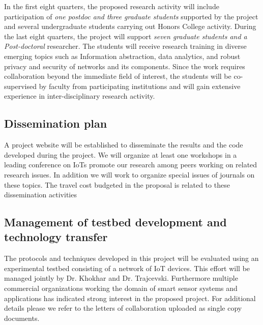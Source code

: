 In the first eight quarters, the proposed research activity will include participation of \textit{one postdoc and three graduate students} supported by the project and several undergraduate students carrying out Honors College activity. During the last eight quarters, the project will support \textit{seven graduate students and a Post-doctoral} researcher. The students will receive research training in diverse emerging topics such as Information abstraction, data analytics, and robust privacy and security of networks and its components. Since the work requires collaboration beyond the immediate field of interest, the students will be co-supervised by faculty from participating institutions and will gain extensive experience in inter-disciplinary research activity.

\subsection{Dissemination plan} 
A project website will be established to disseminate the results and the code developed during the project. We will organize at least one workshops in a leading conference on IoTs promote our research among peers working on related research issues. In addition we will work to organize special issues of journals on these topics. The travel cost budgeted in the proposal is related to these dissemination activities

\subsection{Management of testbed development and technology transfer} 
The protocols and techniques developed in this project will be evaluated using an experimental testbed consisting of a network of IoT devices. This effort will be managed jointly by Dr. Khokhar and Dr. Trajcevski. Furthermore multiple commercial organizations working the domain of smart sensor systems and applications has indicated strong interest in the proposed project. For additional details please we refer to the letters of collaboration uploaded as single copy documents.
